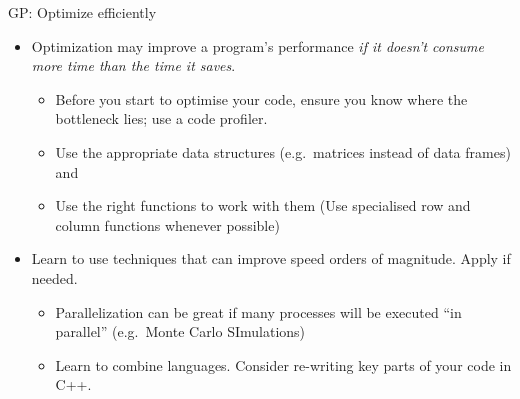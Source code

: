 \documentclass[ignorenonframetext,]{beamer}
\providecommand{\tightlist}{%
  \setlength{\itemsep}{0pt}\setlength{\parskip}{0pt}}
\begin{document}
\begin{frame}{%
\protect\hypertarget{gp-optimize-efficiently}{%
GP: Optimize efficiently}}

\begin{itemize}
\tightlist
\item
  Optimization may improve a program’s performance \emph{if it doesn’t
  consume more time than the time it saves}.

  \begin{itemize}
  \tightlist
  \item
    Before you start to optimise your code, ensure you know where the
    bottleneck lies; use a code profiler.
  \item
    Use the appropriate data structures (e.g.~matrices instead of data
    frames) and
  \item
    Use the right functions to work with them (Use specialised row and
    column functions whenever possible)
  \end{itemize}
\item
  Learn to use techniques that can improve speed orders of magnitude.
  Apply if needed.

  \begin{itemize}
  \tightlist
  \item
    Parallelization can be great if many processes will be executed “in
    parallel” (e.g.~Monte Carlo SImulations)
  \item
    Learn to combine languages. Consider re-writing key parts of your
    code in C++.
  \end{itemize}
\end{itemize}

\end{frame}
\end{document}
